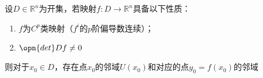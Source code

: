 
\begin{issues}
\issueDraft
\end{issues}
\begin{theorem}{}
设$D\in \mathbb R^n$为开集，若映射$f:D\rightarrow \mathbb R^n$具备以下性质：
\begin{enumerate}
\item $f$为$C^p$类映射（$f^i$的$p$阶偏导数连续）；
\item $\opn{det}Df\neq 0$
\end{enumerate}
则对于$x_0\in D$，存在点$x_0$的邻域$U(x_0)$和对应的点$y_0=f(x_0)$的邻域
\end{theorem}


